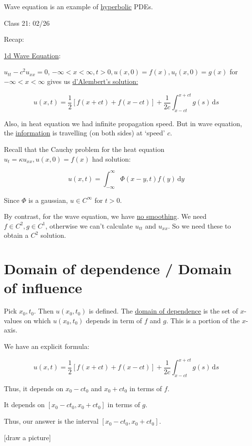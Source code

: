 \documentclass{article}
\theoremstyle{definition}
\begin{document}
Wave equation is an example of \underline{hyperbolic} PDEs.

\hrulefill

Class 21: 02/26

Recap:

\underline{1d Wave Equation}:

\(u_{t t} - c^2 u_{x x} = 0\), \(-\infty <x < \infty, t>0, u(x,0)=f(x),u_t(x,0)=g(x)\) for \(-\infty <x < \infty\) gives us \underline{d'Alembert's solution:}

\[
    u(x,t) = \frac{1}{2}\left[ f(x+ct) + f(x-ct) \right] + \frac{1}{2c} \int_{x - ct}^{x + ct} g(s) \,\mathrm{d}s 
\]

Also, in heat equation we had infinite propagation speed. But in wave equation, the \underline{information} is travelling (on both sides) at `speed' \(c\).

Recall that the Cauchy problem for the heat equation \(u_t = \kappa u_{x x}, u(x,0)=f(x)\) had solution:

\[
    u(x,t) = \int_{-\infty}^{\infty} \Phi(x-y,t)f(y) \,\mathrm{d}y 
\]

Since \(\Phi\) is a gaussian, \(u\in C^{\infty}\) for \(t > 0\).

By contrast, for the wave equation, we have \underline{no smoothing}. We need \(f\in C^2,g\in C^1\), otherwise we can't calculate \(u_{t t}\) and \(u_{x x}\). So we need these to obtain a \(C^2\) solution.

\section*{Domain of dependence / Domain of influence}

Pick \(x_0,t_0\). Then \(u(x_0,t_0)\) is defined. The \underline{domain of dependence} is the set of \(x\)-values on which \(u(x_0,t_0)\) depends in term of \(f\) and \(g\). This is a portion of the \(x\)-axis.

We have an explicit formula:

\[
    u(x,t) = \frac{1}{2}\left[ f(x+ct) + f(x-ct) \right] + \frac{1}{2c} \int_{x-ct}^{x+ct} g(s) \,\mathrm{d}s 
\]

Thus, it depends on \(x_0 - ct_0\) and \(x_0 + ct_0\) in terms of \(f\).

It depends on \([x_0 - ct_0, x_0 + ct_0]\) in terms of \(g\).

Thus, our answer is the interval \([x_0 - ct_0, x_0 + ct_0]\).

[draw a picture]
\end{document}
